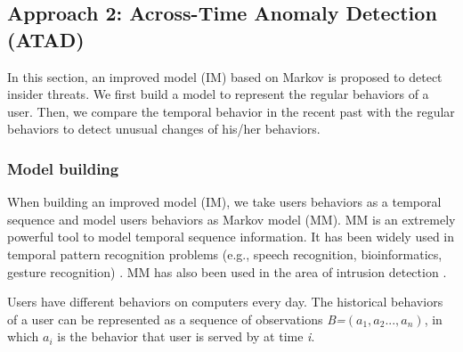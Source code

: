\documentclass[conference]{IEEEtran}
\begin{document}
\subsection{Approach 2: Across-Time Anomaly Detection (ATAD)}

In this section, an improved model (IM) based on Markov is proposed to detect insider threats. We first build a model to represent the regular behaviors of a user. Then, we compare the temporal behavior in the recent past with the regular behaviors to detect unusual changes of his/her behaviors.
 

\subsubsection{Model building}

When building an improved model (IM), we take users behaviors as a temporal sequence and model users behaviors as Markov model (MM).
MM \cite{b21} is an extremely powerful
tool to model temporal sequence information. It has been
widely used in temporal pattern recognition problems (e.g.,
speech recognition, bioinformatics, gesture recognition) \cite{b23}. MM has also been used
in the area of intrusion detection \cite{b21}.

Users have different behaviors on computers every day. 
The historical behaviors of a user can be represented as a sequence of observations \emph{B=$(a_1,a_2...,a_n)$}, in which \emph{$a_i$} is the behavior that user is served by at time \emph{i}. 
\end{document}
